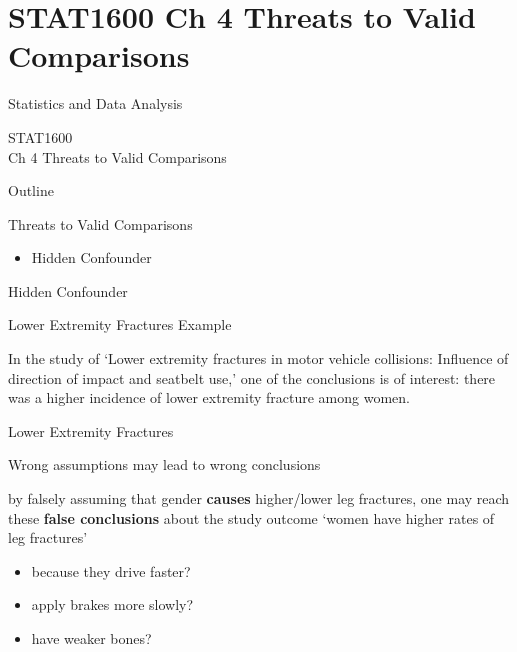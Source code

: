 \documentclass[14pt]{beamer}\usepackage[]{graphicx}\usepackage[]{color}
\begin{document}

\section{STAT1600 Ch 4 Threats to Valid Comparisons}

\begin{frame}[fragile]{Statistics and Data Analysis}

STAT1600 \\ Ch 4 Threats to Valid Comparisons

\end{frame}

\begin{frame}[fragile]{Outline}

Threats to Valid Comparisons  

\begin{itemize}
\item Hidden Confounder
\end{itemize}
\end{frame}

\begin{frame}[fragile]{Hidden Confounder}

Lower Extremity Fractures Example

In the study of `Lower extremity fractures in motor vehicle collisions:  Influence of direction of impact and seatbelt use,' one of the  conclusions is of interest: there was a higher incidence of lower  extremity fracture among women.

\end{frame}

\begin{frame}[fragile]{Lower Extremity Fractures}

Wrong assumptions may lead to wrong conclusions

by falsely assuming that gender \textbf{causes} higher/lower leg fractures, one  may reach these \textbf{false conclusions} about the study outcome `women  have higher rates of leg fractures'

\begin{itemize}
\item because they drive faster?  
\item apply brakes more slowly?  
\item have weaker bones?
\end{itemize}
\end{frame}
\end{document}
